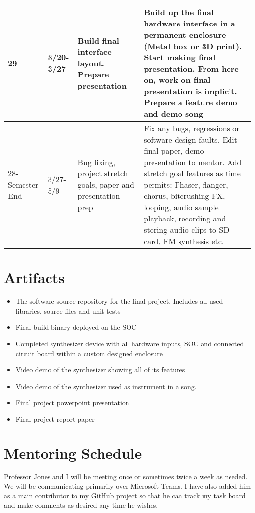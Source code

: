 \documentclass[12pt]{article}
\begin{document}
\begin{longtable}{| m{4em} | m{4em} | m{8em} | m{20em} |}
\hline
\raggedright 29 & \raggedright 3/20-3/27 & Build final interface layout. Prepare presentation & Build up the final hardware interface in a permanent enclosure (Metal box or 3D print). Start making final presentation. From here on, work on final presentation is implicit. Prepare a feature demo and demo song \\
\hline
\raggedright 28-Semester End & \raggedright 3/27-5/9 & \raggedright Bug fixing, project stretch goals, paper and presentation prep & Fix any bugs, regressions or software design faults. Edit final paper, demo presentation to mentor. Add stretch goal features as time permits: Phaser, flanger, chorus, bitcrushing FX, looping, audio sample playback, recording and storing audio clips to SD card, FM synthesis etc. \\
\hline
\end{longtable}

\section{Artifacts}
\begin{itemize}
    \item The software source repository for the final project. Includes all used libraries, source files and unit tests
    \item Final build binary deployed on the SOC
    \item Completed synthesizer device with all hardware inputs, SOC and connected circuit board within a custom designed enclosure
    \item Video demo of the synthesizer showing all of its features
    \item Video demo of the synthesizer used as instrument in a song.
    \item Final project powerpoint presentation
    \item Final project report paper
\end{itemize}

\section{Mentoring Schedule}
Professor Jones and I will be meeting once or sometimes twice a week as needed. We will be communicating primarily over Microsoft Teams. I have also added him as a main contributor to my GitHub project so that he can track my task board and make comments as desired any time he wishes.
\end{document}
